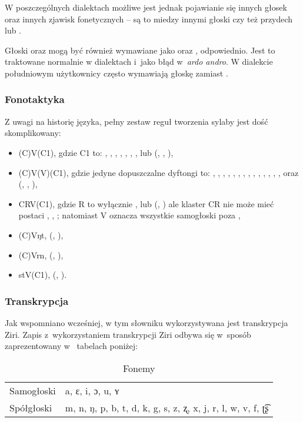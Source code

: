 \begin{spacing}{1.1}
    W poszczególnych dialektach możliwe jest jednak pojawianie się innych głosek
    oraz innych zjawisk fonetycznych -- są to miedzy innymi głoski  czy też
    przydech  lub .

    Głoski  oraz  mogą być również wymawiane jako  oraz ,
    odpowiednio. Jest to traktowane normalnie w dialektach i~jako błąd w~\emph{ardo
        andro}. W dialekcie południowym użytkownicy często wymawiają głoskę 
    zamiast .

    \subsubsection{Fonotaktyka}

    Z uwagi na historię języka, pełny zestaw reguł tworzenia sylaby jest dość
    skomplikowany:

    \begin{itemize}
        \item (C)V(C1), gdzie C1 to: , , , , , , ,  lub  (, , ),
        \item (C)V(V)(C1), gdzie jedyne dopuszczalne dyftongi to: , , , , , , , , , , , , , ,  oraz  (, , ),
        \item CRV(C1), gdzie R to wyłącznie ,  lub  (, ) ale klaster CR nie może mieć postaci , , ; natomiast V oznacza wszystkie samogłoski poza ,
        \item (C)Vŋt, (, ),
        \item (C)Vrn, (, ),
        \item stV(C1), (, ).
    \end{itemize}

    \subsubsection{Transkrypcja}

    Jak wspomniano wcześniej, w tym słowniku wykorzystywana jest transkrypcja Ziri.
    Zapis z~wykorzystaniem transkrypcji Ziri odbywa się w~sposób zaprezentowany w~
    tabelach poniżej:

    \begin{table}[ht]
        \centering
        \caption{Fonemy}
        \begin{tabular}{ll} \toprule
            Samogłoski & a, ɛ, i, ɔ, u, ʏ                                            \\
            Spółgłoski & m, n, ŋ, p, b, t, d, k, g, s, z, ʐ, x, j, r, l, w, v, f, ʈ͡ʂ \\\bottomrule
        \end{tabular}
        \label{tab:phonemes}
    \end{table}


\end{spacing}
